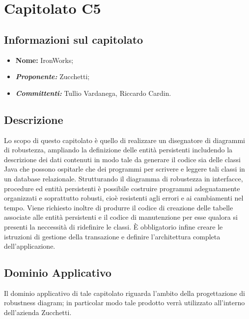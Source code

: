 \section{Capitolato C5}
\subsection{Informazioni sul capitolato}
	\begin{itemize}
		\item \textbf{Nome:}
		IronWorks;
		\item \textbf{\textit{Proponente:}}
		Zucchetti;
		\item \textbf{\textit{Committenti:}}
		Tullio Vardanega, Riccardo Cardin.
	\end{itemize}

\subsection{Descrizione}
	Lo scopo di questo capitolato è quello di realizzare un disegnatore di diagrammi di robustezza, ampliando la definizione delle entità persistenti includendo la descrizione dei dati contenuti in modo tale da generare il codice sia delle classi Java che possono ospitarle che dei programmi per scrivere e leggere tali classi in un database relazionale.
	\newline \newline Strutturando il diagramma di robustezza in interfacce, procedure ed entità persistenti è possibile costruire programmi adeguatamente organizzati e soprattutto robusti, cioè resistenti agli errori e ai cambiamenti nel tempo.
	\newline \newline Viene richiesto inoltre di produrre il codice di creazione delle tabelle associate alle entità persistenti e il codice di manutenzione per esse qualora si presenti la neccessità di ridefinire le classi. È obbligatorio infine creare le istruzioni di gestione della transazione e definire l’architettura completa dell’applicazione.
	
\subsection{Dominio Applicativo}
	Il dominio applicativo di tale capitolato riguarda l'ambito della progettazione di robustness diagram; in particolar modo tale prodotto verrà utilizzato all'interno dell'azienda Zucchetti.
	

